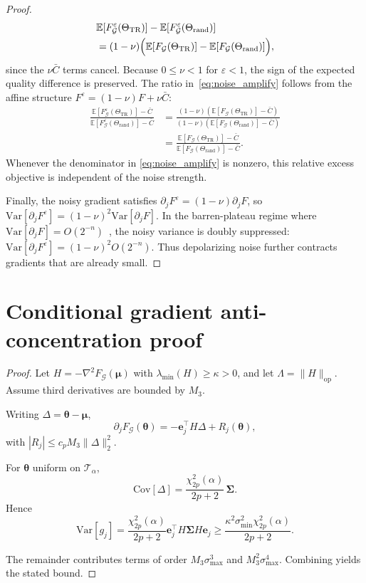 \documentclass[aps,prx,reprint,superscriptaddress,longbibliography]{revtex4-2}
\newcommand{\calG}{\mathcal{G}}
\newcommand{\calT}{\mathcal{T}}
\newcommand{\bbE}{\mathbb{E}}
\begin{document}
\begin{proof}
\begin{align*}
    &\bbE[F_\calG^\varepsilon(\Theta_{\mathrm{TR}})]
    - \bbE[F_\calG^\varepsilon(\Theta_{\mathrm{rand}})] \\
    &= (1-\nu)\Bigl(\bbE[F_\calG(\Theta_{\mathrm{TR}})]
    - \bbE[F_\calG(\Theta_{\mathrm{rand}})]\Bigr),
\end{align*}
since the $\nu\bar{C}$ terms cancel. Because $0 \le \nu < 1$ for
$\varepsilon < 1$, the sign of the expected quality difference is preserved.
The ratio in~\cref{eq:noise_amplify} follows from the affine
structure $F^\varepsilon = (1-\nu)F + \nu\bar{C}$:
\begin{align*}
    \frac{\bbE[F_\calG^\varepsilon(\Theta_{\mathrm{TR}})] - \bar{C}}
    {\bbE[F_\calG^\varepsilon(\Theta_{\mathrm{rand}})] - \bar{C}}
    &= \frac{(1-\nu)(\bbE[F_\calG(\Theta_{\mathrm{TR}})] - \bar{C})}
    {(1-\nu)(\bbE[F_\calG(\Theta_{\mathrm{rand}})] - \bar{C})} \\
    &= \frac{\bbE[F_\calG(\Theta_{\mathrm{TR}})] - \bar{C}}
    {\bbE[F_\calG(\Theta_{\mathrm{rand}})] - \bar{C}}.
\end{align*}
Whenever the denominator in \cref{eq:noise_amplify} is nonzero, this
relative excess objective is independent of the noise strength.

Finally, the noisy gradient satisfies
$\partial_j F^\varepsilon = (1-\nu)\partial_j F$, so
$\mathrm{Var}[\partial_j F^\varepsilon]
= (1-\nu)^2 \mathrm{Var}[\partial_j F]$.
In the barren-plateau regime where
$\mathrm{Var}[\partial_j F] = O(2^{-n})$~\cite{mcclean2018},
the noisy variance is doubly suppressed:
$\mathrm{Var}[\partial_j F^\varepsilon] = (1-\nu)^2 O(2^{-n})$.
Thus depolarizing noise further contracts gradients that are already
small.
\end{proof}

\section{Conditional gradient anti-concentration proof}
\label{app:proof_anticonc}

\begin{proof}
Let $H = -\nabla^2 F_\calG(\bm\mu)$ with
$\lambda_{\min}(H) \ge \kappa > 0$, and let
$\Lambda = \|H\|_{\mathrm{op}}$.
Assume third derivatives are bounded by $M_3$.

Writing $\Delta = \bm\theta - \bm\mu$,
\[
\partial_j F_\calG(\bm\theta)
= -\bm e_j^\top H\Delta + R_j(\bm\theta),
\]
with $|R_j| \le c_p M_3 \|\Delta\|_2^2$.

For $\bm\theta$ uniform on $\calT_\alpha$,
\[
\mathrm{Cov}[\Delta]
= \frac{\chi^2_{2p}(\alpha)}{2p+2}\,\bm\Sigma.
\]
Hence
\[
\mathrm{Var}[g_j]
= \frac{\chi^2_{2p}(\alpha)}{2p+2}
\bm e_j^\top H\bm\Sigma H \bm e_j
\ge \frac{\kappa^2 \sigma_{\min}^2 \chi^2_{2p}(\alpha)}{2p+2}.
\]

The remainder contributes terms of order
$M_3\sigma_{\max}^3$ and $M_3^2\sigma_{\max}^4$.
Combining yields the stated bound.
\end{proof}
\end{document}
